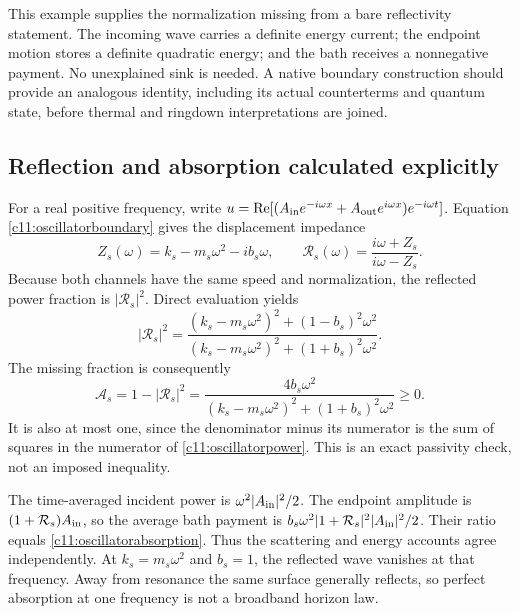 This example supplies the normalization missing from a bare reflectivity statement. The incoming wave carries a definite energy current; the endpoint motion stores a definite quadratic energy; and the bath receives a nonnegative payment. No unexplained sink is needed. A native boundary construction should provide an analogous identity, including its actual counterterms and quantum state, before thermal and ringdown interpretations are joined.

\subsection{Reflection and absorption calculated explicitly}
For a real positive frequency, write $u=\operatorname{Re}[(A_{\rm in}e^{-i\omega x}+A_{\rm out}e^{i\omega x})e^{-i\omega t}]$. Equation \eqref{c11:oscillatorboundary} gives the displacement impedance
\begin{equation}
 Z_s(\omega)=k_s-m_s\omega^2-i b_s\omega,
 \qquad
 \mathcal R_s(\omega)=\frac{i\omega+Z_s}{i\omega-Z_s}.
 \label{c11:oscillatorR}
\end{equation}
Because both channels have the same speed and normalization, the reflected power fraction is $|\mathcal R_s|^2$. Direct evaluation yields
\begin{equation}
 |\mathcal R_s|^2=
 \frac{(k_s-m_s\omega^2)^2+(1-b_s)^2\omega^2}
 {(k_s-m_s\omega^2)^2+(1+b_s)^2\omega^2}.
 \label{c11:oscillatorpower}
\end{equation}
The missing fraction is consequently
\begin{equation}
 \mathcal A_s=1-|\mathcal R_s|^2
 =\frac{4b_s\omega^2}
 {(k_s-m_s\omega^2)^2+(1+b_s)^2\omega^2}\geq0.
 \label{c11:oscillatorabsorption}
\end{equation}
It is also at most one, since the denominator minus its numerator is the sum of squares in the numerator of \eqref{c11:oscillatorpower}. This is an exact passivity check, not an imposed inequality.

The time-averaged incident power is $\omega^2|A_{\rm in}|^2/2$. The endpoint amplitude is $(1+\mathcal R_s)A_{\rm in}$, so the average bath payment is $b_s\omega^2|1+\mathcal R_s|^2|A_{\rm in}|^2/2$. Their ratio equals \eqref{c11:oscillatorabsorption}. Thus the scattering and energy accounts agree independently. At $k_s=m_s\omega^2$ and $b_s=1$, the reflected wave vanishes at that frequency. Away from resonance the same surface generally reflects, so perfect absorption at one frequency is not a broadband horizon law.

